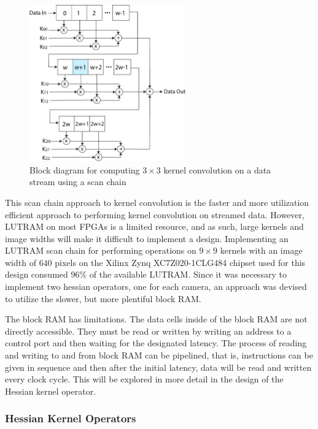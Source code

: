 \documentclass[sigconf]{acmart/acmart}
\begin{document}
\begin{figure}[h]
	\centering
	\includegraphics[width=0.6\textwidth]{figures/block/scanchain}
	\caption{Block diagram for computing $3 \times 3$ kernel convolution on a data stream using a scan chain}
	\label{fig_block_scanchain}
\end{figure}

This scan chain approach to kernel convolution is the faster and more utilization efficient approach to performing kernel convolution on streamed data. However, LUTRAM on most FPGAs is a limited resource, and as such, large kernels and image widths will make it difficult to implement a design. Implementing an LUTRAM scan chain for performing operations on $9 \times 9$ kernels with an image width of $640$ pixels on the Xilinx Zynq XC7Z020-1CLG484 chipset used for this design consumed $96\%$ of the available LUTRAM. Since it was necessary to implement two hessian operators, one for each camera, an approach was devised to utilize the slower, but more plentiful block RAM.

The block RAM has limitations. The data cells inside of the block RAM are not directly accessible. They must be read or written by writing an address to a control port and then waiting for the designated latency. The process of reading and writing to and from block RAM can be pipelined, that is, instructions can be given in sequence and then after the initial latency, data will be read and written every clock cycle. This will be explored in more detail in the design of the Hessian kernel operator.

\subsubsection{Hessian Kernel Operators}
\end{document}
